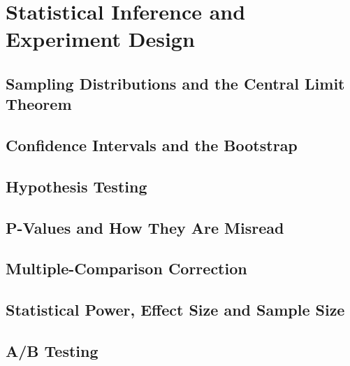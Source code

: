 \section{Statistical Inference and Experiment Design}
\label{sec:statistical-inference}


\subsection{Sampling Distributions and the Central Limit Theorem}


\subsection{Confidence Intervals and the Bootstrap}

\subsection{Hypothesis Testing}


\subsection{P-Values and How They Are Misread}

\subsection{Multiple-Comparison Correction}


\subsection{Statistical Power, Effect Size and Sample Size}

\subsection{A/B Testing}

